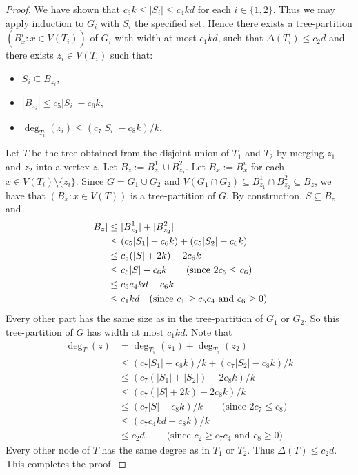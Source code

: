 \begin{proof}
We have shown that $c_3k \leq |S_i|\leq c_4kd$ for each $i\in\{1,2\}$. Thus we may apply induction to $G_i$ with $S_i$ the specified set. Hence there exists a tree-partition $(B^i_x:x\in V(T_i))$ of $G_i$ with width at most $c_1 kd$, such that $\Delta(T_i)\leq c_2d$ and there exists $z_i\in V(T_i)$ such that:
\begin{itemize}
    \item $S_i\subseteq B_{z_i}$, 
    \item $|B_{z_i}|\leq c_5|S_i|-c_6k$,
    \item $\deg_{T_i}(z_i)\leq ( c_7 |S_i| - c_8 k)/k$.
\end{itemize}
Let $T$ be the tree obtained from the disjoint union of $T_1$ and $T_2$ by merging $z_1$ and $z_2$ into a vertex $z$. Let $B_z:= B^1_{z_1}\cup B^2_{z_2}$. Let $B_x:= B^i_x$ for each $x\in V(T_i)\setminus\{z_i\}$. Since $G=G_1\cup G_2$ and $V(G_1\cap G_2)\subseteq B^1_{z_1}\cap B^2_{z_2} \subseteq B_z$, we have that $(B_x:x\in V(T))$ is a tree-partition of $G$. By construction, $S\subseteq B_z$ and
\begin{align*}
    |B_z| & \leq |B^1_{z_1}|+|B^2_{z_2}|\\
    & \leq (c_5|S_1|-c_6k) +  (c_5|S_2|-c_6k)\\
    & \leq c_5(|S|+2k)-2c_6k \\
    & \leq c_5|S|-c_6 k\qquad \text{(since $ 2c_5 \leq c_6 $)}\\
    & \leq c_5 c_4 kd - c_6 k \\
    & \leq c_1 kd \quad \text{(since $c_1 \geq c_5c_4$ and $c_6\geq 0$)}
\end{align*}
Every other part has the same size as in the tree-partition of $G_1$ or $G_2$. So this tree-partition of $G$ has width at most $c_1kd$. 
Note that 
\begin{align*}
 \deg_T(z)  & = \deg_{T_1}(z_1) + \deg_{T_2}(z_2)\\
    & \leq  (c_7|S_1|-c_8k)/k + (c_7|S_2|-c_8k)/k\\
    & \leq  (c_7(|S_1|+|S_2|)-2c_8k)/k\\
    & \leq  (c_7(|S|+2k)-2c_8k)/k\\
    & \leq  (c_7|S|-c_8k)/k \qquad \text{(since $2c_7  \leq  c_8$)}\\
    & \leq  (c_7c_4kd-c_8k)/k \\
    & \leq  c_2 d. \qquad \text{(since $c_2 \geq c_7c_4$ and $c_8 \geq 0$)}
\end{align*}
Every other node of $T$ has the same degree as in $T_1$ or $T_2$. 
Thus $\Delta(T) \leq c_2d$. This completes the proof.
\end{proof}



